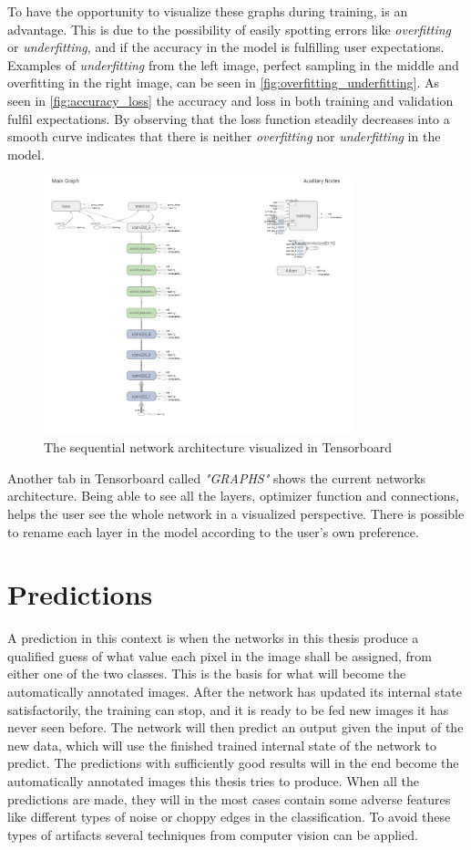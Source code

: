 \documentclass[USenglish]{ifimaster}  %
\begin{document}
To have the opportunity to visualize these graphs during training, is an advantage. This is due to the possibility of easily spotting errors like \textit{overfitting} or \textit{underfitting}, and if the accuracy in the model is fulfilling user expectations. Examples of \textit{underfitting} from the left image, perfect sampling in the middle and overfitting in the right image, can be seen in \cref{fig:overfitting_underfitting}. As seen in \cref{fig:accuracy_loss} the accuracy and loss in both training and validation fulfil expectations. 
By observing that the loss function steadily decreases into a smooth curve indicates that there is neither \textit{overfitting} nor \textit{underfitting} in the model.

\begin{figure}[H]
    \centering
    \includegraphics[width=0.8\textwidth]{bilder/tensorboard_graph.PNG}
    \caption{The sequential network architecture visualized in Tensorboard}
    \label{fig:graph}
\end{figure}
Another tab in Tensorboard called \textit{"GRAPHS"} shows the current networks architecture. Being able to see all the layers, optimizer function and connections, helps the user see the whole network in a visualized perspective. There is possible to rename each layer in the model according to the user's own preference. 
\section{Predictions}
A prediction in this context is when the networks in this thesis produce a qualified guess of what value each pixel in the image shall be assigned, from either one of the two classes. This is the basis for what will become the automatically annotated images. After the network has updated its internal state satisfactorily, the training can stop, and it is ready to be fed new images it has never seen before. The network will then predict an output given the input of the new data, which will use the finished trained internal state of the network to predict. The predictions with sufficiently good results will in the end become the automatically annotated images this thesis tries to produce. When all the predictions are made, they will in the most cases contain some adverse features like different types of noise or choppy edges in the classification. To avoid these types of artifacts several techniques from computer vision can be applied. 
\end{document}
